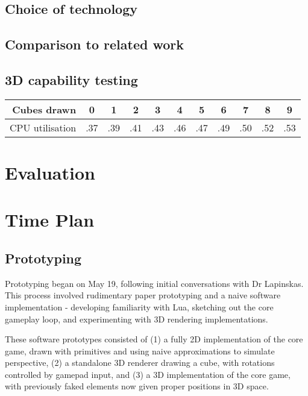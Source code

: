 \documentclass{article}
\begin{document}
\subsection*{Choice of technology}
\subsection*{Comparison to related work}


\subsection*{3D capability testing}
\begin{center}
\begin{tabular}{r|c c c c c c c c c c}
     Cubes drawn & 0 & 1 & 2 & 3 & 4 & 5 & 6 & 7 & 8 & 9 \\
     \hline
     CPU utilisation & .37 & .39 & .41 & .43 & .46 & .47 & .49 & .50 & .52 & .53
\end{tabular}
\end{center}

\section{Evaluation}

\section{Time Plan}
\subsection*{Prototyping}
Prototyping began on May 19, following initial conversations with Dr Lapinskas. This process involved
rudimentary paper prototyping and a naive software implementation - developing familiarity with Lua,
sketching out the core gameplay loop, and experimenting with 3D rendering implementations. 

These software prototypes consisted of (1) a fully 2D implementation of the core game,
drawn with primitives and using naive approximations to simulate perspective,
(2) a standalone 3D renderer drawing a cube, with rotations controlled by gamepad input,
and (3) a 3D implementation of the core game, with previously faked elements
now given proper positions in 3D space.
\end{document}
